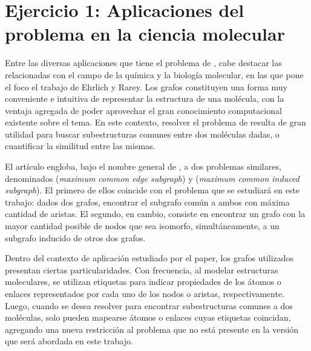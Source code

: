 \section{Ejercicio 1: Aplicaciones del problema en la ciencia molecular}


Entre las diversas aplicaciones que tiene el problema de , cabe
destacar las relacionadas con el campo de la química y la biología molecular,
en las que pone el foco el trabajo de Ehrlich y Rarey\cite{ehrlich}. Los
grafos constituyen una forma muy conveniente e intuitiva de representar la
estructura de una molécula, con la ventaja agregada de poder aprovechar el
gran conocimiento computacional existente sobre el tema. En este contexto,
resolver el problema de  resulta de gran utilidad para buscar
subestructuras comunes entre dos moléculas dadas, o cuantificar la similitud
entre las mismas.

El artículo engloba, bajo el nombre general de , a dos problemas
similares, denominados  (\emph{maximum common edge subgraph}) y
 (\emph{maximum common induced subgraph}). El primero de ellos
coincide con el problema que se estudiará en este trabajo: dados dos grafos,
encontrar el subgrafo común a ambos con máxima cantidad de aristas. El
segundo, en cambio, consiste en encontrar un grafo con la mayor cantidad
posible de nodos que sea isomorfo, simultáneamente, a un subgrafo inducido de
otros dos grafos.

Dentro del contexto de aplicación estudiado por el paper, los grafos
utilizados presentan ciertas particularidades. Con frecuencia, al modelar
estructuras moleculares, se utilizan etiquetas para indicar propiedades de los
átomos o enlaces representados por cada uno de los nodos o aristas,
respectivamente. Luego, cuando se desea resolver  para encontrar
subestructuras comunes a dos moléculas, solo pueden mapearse átomos o enlaces
cuyas etiquetas coincidan, agregando una nueva restricción al problema que no
está presente en la versión que será abordada en este trabajo.


